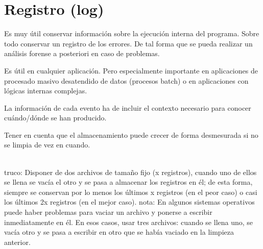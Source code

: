 \documentclass[spanish,12pt,a4paper,final,oneside]{book}
\begin{document}
\vspace{1cm}




\section{Registro (log)}
Es muy útil conservar información sobre la ejecución interna del programa. Sobre todo conservar un registro de los errores. De tal forma que se pueda realizar un análisis forense a posteriori en caso de problemas.

Es útil en cualquier aplicación. Pero especialmente importante en aplicaciones de procesado masivo desatendido de datos (procesos batch) o en aplicaciones con lógicas internas complejas.

La información de cada evento ha de incluir el contexto necesario para conocer cuándo/dónde se han producido.

Tener en cuenta que el almacenamiento puede crecer de forma desmesurada si no se limpia de vez en cuando. 
\begin{footnotesize}
\\truco: Disponer de dos archivos de tamaño fijo (x registros), cuando uno de ellos se llena se vacía el otro y se pasa a almacenar los registros en él; de esta forma, siempre se conservan por lo menos los últimos x registros (en el peor caso) o casi los últimos 2x registros (en el mejor caso). nota: En algunos sistemas operativos puede haber problemas para vaciar un archivo y ponerse a escribir inmediatamente en él. En esos casos, usar tres archivos: cuando se llena uno, se vacía otro y se pasa a escribir en otro que se había vaciado en la limpieza anterior.
\end{footnotesize}
\end{document}
